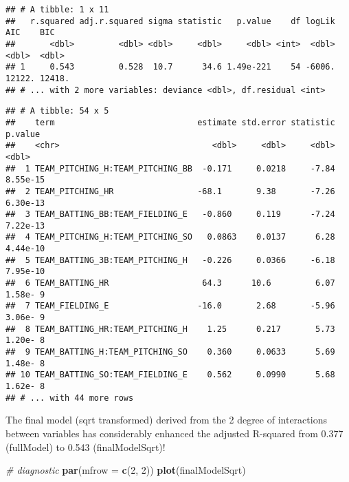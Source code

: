 \documentclass[
]{article}
\newenvironment{Shaded}{\begin{snugshade}}{\end{snugshade}}
\newcommand{\CommentTok}[1]{\textcolor[rgb]{0.56,0.35,0.01}{\textit{#1}}}
\newcommand{\DataTypeTok}[1]{\textcolor[rgb]{0.13,0.29,0.53}{#1}}
\newcommand{\DecValTok}[1]{\textcolor[rgb]{0.00,0.00,0.81}{#1}}
\newcommand{\KeywordTok}[1]{\textcolor[rgb]{0.13,0.29,0.53}{\textbf{#1}}}
\newcommand{\NormalTok}[1]{#1}
\newcommand{\OperatorTok}[1]{\textcolor[rgb]{0.81,0.36,0.00}{\textbf{#1}}}
\newcommand{\StringTok}[1]{\textcolor[rgb]{0.31,0.60,0.02}{#1}}
\begin{document}
\begin{verbatim}
## # A tibble: 1 x 11
##   r.squared adj.r.squared sigma statistic   p.value    df logLik    AIC    BIC
##       <dbl>         <dbl> <dbl>     <dbl>     <dbl> <int>  <dbl>  <dbl>  <dbl>
## 1     0.543         0.528  10.7      34.6 1.49e-221    54 -6006. 12122. 12418.
## # ... with 2 more variables: deviance <dbl>, df.residual <int>
\end{verbatim}

\begin{Shaded}
\end{Shaded}

\begin{verbatim}
## # A tibble: 54 x 5
##    term                             estimate std.error statistic  p.value
##    <chr>                               <dbl>     <dbl>     <dbl>    <dbl>
##  1 TEAM_PITCHING_H:TEAM_PITCHING_BB  -0.171     0.0218     -7.84 8.55e-15
##  2 TEAM_PITCHING_HR                 -68.1       9.38       -7.26 6.30e-13
##  3 TEAM_BATTING_BB:TEAM_FIELDING_E   -0.860     0.119      -7.24 7.22e-13
##  4 TEAM_PITCHING_H:TEAM_PITCHING_SO   0.0863    0.0137      6.28 4.44e-10
##  5 TEAM_BATTING_3B:TEAM_PITCHING_H   -0.226     0.0366     -6.18 7.95e-10
##  6 TEAM_BATTING_HR                   64.3      10.6         6.07 1.58e- 9
##  7 TEAM_FIELDING_E                  -16.0       2.68       -5.96 3.06e- 9
##  8 TEAM_BATTING_HR:TEAM_PITCHING_H    1.25      0.217       5.73 1.20e- 8
##  9 TEAM_BATTING_H:TEAM_PITCHING_SO    0.360     0.0633      5.69 1.48e- 8
## 10 TEAM_BATTING_SO:TEAM_FIELDING_E    0.562     0.0990      5.68 1.62e- 8
## # ... with 44 more rows
\end{verbatim}

The final model (sqrt transformed) derived from the 2 degree of
interactions between variables has considerably enhanced the adjusted
R-squared from 0.377 (fullModel) to 0.543 (finalModelSqrt)!

\begin{Shaded}
\begin{Highlighting}[]
\CommentTok{# diagnostic}
\KeywordTok{par}\NormalTok{(}\DataTypeTok{mfrow =} \KeywordTok{c}\NormalTok{(}\DecValTok{2}\NormalTok{, }\DecValTok{2}\NormalTok{))}
\KeywordTok{plot}\NormalTok{(finalModelSqrt)}
\end{Highlighting}
\end{Shaded}
\end{document}
